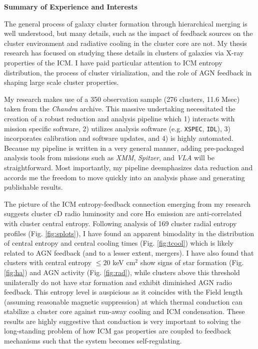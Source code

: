 \documentclass[11pt]{article}
\begin{document}
\begin{center}
\large
\textbf{Summary of Experience and Interests}
\normalsize
\end{center}

The general process of galaxy cluster formation through hierarchical
merging is well understood, but many details, such as the impact of
feedback sources on the cluster environment and radiative cooling in
the cluster core are not. My thesis research has focused on studying
these details in clusters of galaxies via X-ray properties of the
ICM. I have paid particular attention to ICM entropy distribution, the
process of cluster virialization, and the role of AGN feedback in
shaping large scale cluster properties.

My research makes use of a 350 observation sample (276 clusters, 11.6
Msec) taken from the {\textit{Chandra}} archive. This massive
undertaking necessitated the creation of a robust reduction and
analysis pipeline which 1) interacts with mission specific software,
2) utilizes analysis software (e.g. {\tt{XSPEC}}, {\tt{IDL}}), 3)
incorporates calibration and software updates, and 4) is highly
automated. Because my pipeline is written in a very general manner,
adding pre-packaged analysis tools from missions such as
{\textit{XMM}}, {\textit{Spitzer}}, and {\textit{VLA}} will be
straightforward. Most importantly, my pipeline deemphasizes data
reduction and accords me the freedom to move quickly into an analysis
phase and generating publishable results.

The picture of the ICM entropy-feedback connection emerging from my
research suggests cluster cD radio luminosity and core H$\alpha$
emission are anti-correlated with cluster central entropy. Following
analysis of 169 cluster radial entropy profiles
(Fig. \ref{fig:splots}), I have found an apparent bimodality in the
distribution of central entropy and central cooling times
(Fig. \ref{fig:tcool}) which is likely related to AGN feedback (and to
a lesser extent, mergers). I have also found that clusters with
central entropy $\leq 20$ keV cm$^2$ show signs of star formation
(Fig. \ref{fig:ha}) and AGN activity (Fig. \ref{fig:rad}), while
clusters above this threshold unilaterally do not have star formation
and exhibit diminished AGN radio feedback. This entropy level is
auspicious as it coincides with the Field length (assuming reasonable
magnetic suppression) at which thermal conduction can stabilize a
cluster core against run-away cooling and ICM condensation. These
results are highly suggestive that conduction is very important to
solving the long-standing problem of how ICM gas properties are
coupled to feedback mechanisms such that the system becomes
self-regulating.
\end{document}
